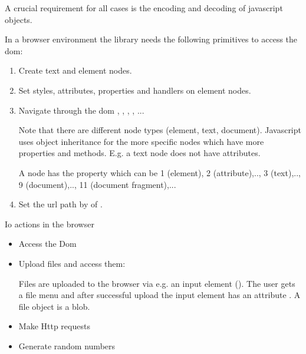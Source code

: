 A crucial requirement for all cases is the encoding and decoding of javascript
objects.


In a browser environment the library needs the following primitives to access
the dom:


\begin{enumerate}

\item Create text and element nodes.

\item Set styles, attributes, properties and handlers on element nodes.

\item Navigate through the dom , ,
, , ...

    Note that there are different node types (element, text, document).
    Javascript uses object inheritance for the more specific nodes which have
    more properties and methods. E.g. a text node does not have attributes.

    A node has the property  which can be 1 (element), 2
    (attribute),.., 3 (text),.., 9 (document),.., 11 (document fragment),...


\item Set the url path by  of
.


\end{enumerate}


Io actions in the browser

\begin{itemize}

\item Access the Dom

\item Upload files and access them:

    Files are uploaded to the browser via e.g. an input element (). The user gets a file menu and after successful upload
        the input element has an attribute . A file object is a
        blob.

\item Make Http requests

\item Generate random numbers


\end{itemize}







